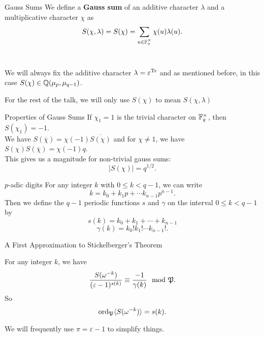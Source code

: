 \documentclass[presentation]{beamer}
\begin{document}
\begin{frame}{Gauss Sums}
We define a \textbf{Gauss sum} of an additive character $\lambda$ and a multiplicative character $\chi$ as \[S(\chi, \lambda) = S(\chi) = \sum_{u \in \mathbb{F}_q^\times} \chi(u) \lambda(u).\]
\\
\pause
\vspace{0.5cm}

We will always fix the additive character $\lambda = \varepsilon^{\textrm{Tr}}$ and as mentioned before, in this case $S(\chi) \in \mathbb{Q}(\mu_p, \mu_{q-1})$.\\
\vspace{0.5cm}

For the rest of the talk, we will only use $S(\chi)$ to mean $S(\chi, \lambda)$
\end{frame}

\begin{frame}{Properties of Gauss Sums}
If $\chi_1 = 1$ is the trivial character on $\mathbb{F}_q^\times$, then $S(\chi_1) = -1$.\\
\vspace{0.5cm}
We have $S(\overline{\chi}) = \chi(-1)\overline{S(\chi)}$ and for $\chi \neq 1$, we have $S(\chi) S(\overline{\chi}) = \chi(-1) q$.
\\
\pause
\vspace{0.5cm}
This gives us a magnitude for non-trivial gauss sums: 
\[ |S(\chi)| = q^{1/2}.\]
\end{frame}


\begin{frame}{$p$-adic digits}
For any integer $k$ with $0 \leq k < q-1$, we can write \[k = k_0 + k_1 p + \cdots k_{n-1} p^{n-1}.\]
\pause
\vspace{0.5cm}
Then we define the $q-1$ periodic functions $s$ and $\gamma$ on the interval $0 \leq k < q-1$ by
\[s(k) = k_0 + k_1 + \cdots +k_{n-1} \]
\[\gamma(k) = k_0! k_1! \cdots k_{n-1}!.\]
\end{frame}

\begin{frame}{A First Approximation to Stickelberger's Theorem}
\begin{theorem}
For any integer $k$, we have \[\frac{S(\omega^{-k})}{(\varepsilon - 1)^{s(k)}} \equiv \frac{-1}{\gamma(k)} \mod {\mathfrak{P}}.\]
So \[\textrm{ord}_{\mathfrak{P}} \langle S(\omega^{-k} ) \rangle= s(k).\]
\end{theorem}

We will frequently use $\pi = \varepsilon - 1$ to simplify things.
\end{frame}
\end{document}
